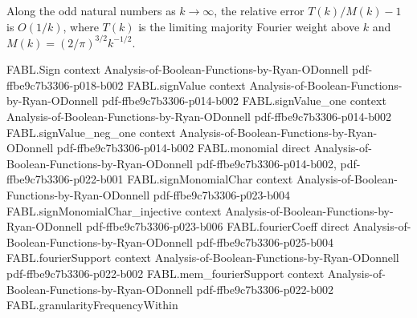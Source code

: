 \begin{theorem}
\label{FABL.limitingMajorityFourierWeightAbove_relativeError_isBigO}
\leanok
{}
Along the odd natural numbers as $k\to\infty$, the relative error $T(k)/M(k)-1$ is
$O(1/k)$, where $T(k)$ is the limiting majority Fourier weight above $k$ and
$M(k)=(2/\pi)^{3/2}k^{-1/2}$.
\end{theorem}

\begin{theorem}
\label{FABL.fourierWeightAtLevel_majority_eq_zero_of_even}
\leanok
{}
\proofstep
  {FABL.Sign}
  {context}
  {Analysis-of-Boolean-Functions-by-Ryan-ODonnell}
  {pdf-ffbe9c7b3306-p018-b002}
\proofstep
  {FABL.signValue}
  {context}
  {Analysis-of-Boolean-Functions-by-Ryan-ODonnell}
  {pdf-ffbe9c7b3306-p014-b002}
\proofstep
  {FABL.signValue_one}
  {context}
  {Analysis-of-Boolean-Functions-by-Ryan-ODonnell}
  {pdf-ffbe9c7b3306-p014-b002}
\proofstep
  {FABL.signValue_neg_one}
  {context}
  {Analysis-of-Boolean-Functions-by-Ryan-ODonnell}
  {pdf-ffbe9c7b3306-p014-b002}
\proofstep
  {FABL.monomial}
  {direct}
  {Analysis-of-Boolean-Functions-by-Ryan-ODonnell}
  {pdf-ffbe9c7b3306-p014-b002,
    pdf-ffbe9c7b3306-p022-b001}
\proofstep
  {FABL.signMonomialChar}
  {context}
  {Analysis-of-Boolean-Functions-by-Ryan-ODonnell}
  {pdf-ffbe9c7b3306-p023-b004}
\proofstep
  {FABL.signMonomialChar_injective}
  {context}
  {Analysis-of-Boolean-Functions-by-Ryan-ODonnell}
  {pdf-ffbe9c7b3306-p023-b006}
\proofstep
  {FABL.fourierCoeff}
  {direct}
  {Analysis-of-Boolean-Functions-by-Ryan-ODonnell}
  {pdf-ffbe9c7b3306-p025-b004}
\proofstep
  {FABL.fourierSupport}
  {context}
  {Analysis-of-Boolean-Functions-by-Ryan-ODonnell}
  {pdf-ffbe9c7b3306-p022-b002}
\proofstep
  {FABL.mem_fourierSupport}
  {context}
  {Analysis-of-Boolean-Functions-by-Ryan-ODonnell}
  {pdf-ffbe9c7b3306-p022-b002}
\proofstep
  {FABL.granularityFrequencyWithin}

\end{theorem}
